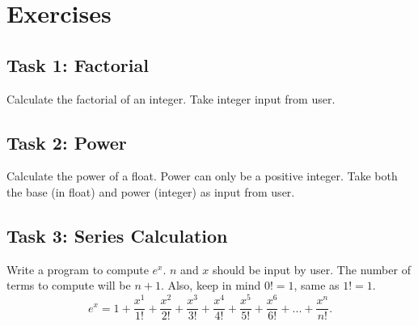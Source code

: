 \documentclass[12pt,a4paper]{article}
\begin{document}
\section{Exercises}
\subsection{Task 1: Factorial} Calculate the factorial of an integer. Take integer input from user.
\subsection{Task 2: Power} Calculate the power of a float. Power can only be a positive integer. Take both the base (in float) and power (integer) as input from user.
\subsection{Task 3: Series Calculation} Write a program to compute $e^x$. $n$ and $x$ should be input by user. The number of terms to compute will be $n+1$. Also, keep in mind $0! = 1$, same as $1! = 1$.
\begin{equation}
e^x = 1+\dfrac{x^1}{1!}+\dfrac{x^2}{2!}+\dfrac{x^3}{3!}+\dfrac{x^4}{4!}+\dfrac{x^5}{5!}+\dfrac{x^6}{6!}+...+\dfrac{x^n}{n!}.
\label{eq:ex-Taylor-Series}
\end{equation}
\end{document}
